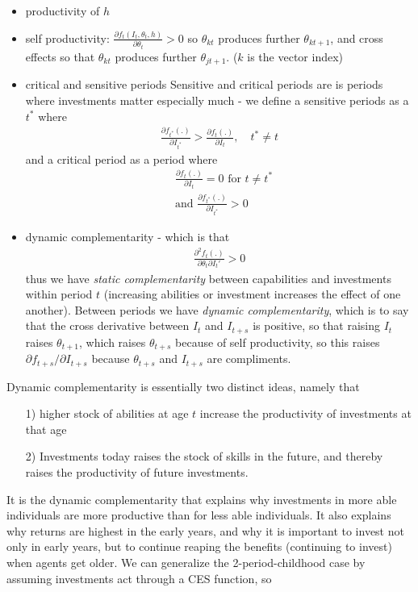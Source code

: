 \documentclass[12pt, a4paper]{article}
\begin{document}
\begin{multicols}{2}
\begin{itemize}
\item productivity of $h$
\item self productivity: $\frac{\partial f_t(I_t, \theta_t, h)}{\partial \theta_t}>0$ so $\theta_{kt}$ produces further $\theta_{kt+1}$, and cross effects so that $\theta_{kt}$ produces further $\theta_{jt+1}$. ($k$ is the vector index)
\item critical and sensitive periods
Sensitive and critical periods are is periods where investments matter especially much - we define a sensitive periods as a $t^*$ where
\begin{align*}
\frac{\partial f_{t^*}(.) }{\partial I_{t^*}} > \frac{\partial f_t(.) }{\partial I_t }, \quad t^* \neq t
\end{align*}
and a critical period as a period where
\begin{align*}
&\frac{\partial f_t(.) }{\partial I_t } = 0 \text{ for } t \neq t^* \\
&\text{and } \frac{\partial f_{t^*}(.) }{\partial I_{t^*}}>0
\end{align*}
\item dynamic complementarity - which is that
\begin{align*}
\frac{\partial^2 f_t(.)}{\partial \theta_t \partial I_t'}>0
\end{align*}
thus we have \textit{static complementarity} between capabilities and investments within period $t$ (increasing abilities or investment increases the effect of one another). Between periods we have \textit{dynamic complementarity}, which is to say that the cross derivative between $I_t$ and $I_{t+s}$ is positive, so that raising $I_t$ raises $\theta_{t+1}$, which raises $\theta_{t+s}$ because of self productivity, so this raises $\partial f_{t+s}/\partial I_{t+s}$ because $\theta_{t+s}$ and $I_{t+s}$ are compliments.
\end{itemize}
Dynamic complementarity is essentially two distinct ideas, namely that
\begin{itemize}
\item[1)] higher stock of abilities at age $t$ increase the productivity of investments at that age
\item[2)] Investments today raises the stock of skills in the future, and thereby raises the productivity of future investments.
\end{itemize}
It is the dynamic complementarity that explains why investments in more able individuals are more productive than for less able individuals. It also explains why returns are highest in the early years, and why it is important to invest not only in early years, but to continue reaping the benefits (continuing to invest) when agents get older. We can generalize the 2-period-childhood case by assuming investments act through a CES function, so

\end{multicols}
\end{document}
